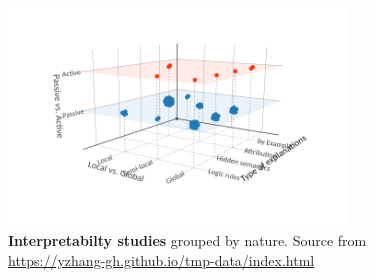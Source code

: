 \begin{figure}[H]
    \centering
    \includegraphics[width=0.8\textwidth]{fig/rel/images/ZhangsInterpspace.png}
    \caption{\textbf{Interpretabilty studies} grouped by nature. Source from \url{https://yzhang-gh.github.io/tmp-data/index.html}}
    \label{fig:rel_zhangs}
\end{figure}
